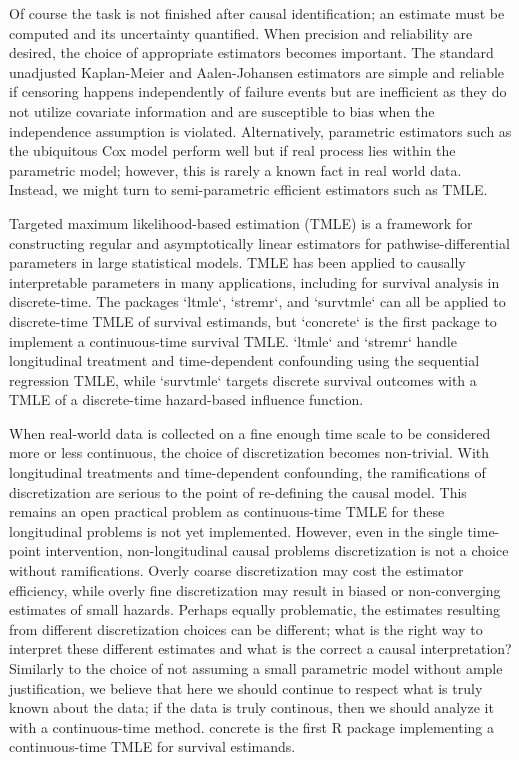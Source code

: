 \documentclass{report}
\newcommand{\1}{\ensuremath{\mathbf{1}}}
\begin{document}
Of course the task is not finished after causal identification; an estimate must be computed and its uncertainty quantified. When precision and reliability are desired, the choice of appropriate estimators becomes important. The standard unadjusted Kaplan-Meier and Aalen-Johansen estimators are simple and reliable if censoring happens independently of failure events but are inefficient as they do not utilize covariate information and are susceptible to bias when the independence assumption is violated. Alternatively, parametric estimators such as the ubiquitous Cox model perform well but if real process lies within the parametric model; however, this is rarely a known fact in real world data. Instead, we might turn to semi-parametric efficient estimators such as TMLE.

Targeted maximum likelihood-based estimation (TMLE) is a framework for constructing regular and asymptotically linear estimators for pathwise-differential parameters in large statistical models. TMLE has been applied to causally interpretable parameters in many applications, including for survival analysis in discrete-time. The packages `ltmle`, `stremr`, and `survtmle` can all be applied to discrete-time TMLE of survival estimands, but `concrete` is the first package to implement a continuous-time survival TMLE. `ltmle` and `stremr` handle longitudinal treatment and time-dependent confounding using the sequential regression TMLE, while `survtmle` targets discrete survival outcomes with a TMLE of a discrete-time hazard-based influence function.

When real-world data is collected on a fine enough time scale to be considered more or less continuous, the choice of discretization becomes non-trivial. With longitudinal treatments and time-dependent confounding, the ramifications of discretization are serious to the point of re-defining the causal model. This remains an open practical problem as continuous-time TMLE for these longitudinal problems is not yet implemented. However, even in the single time-point intervention, non-longitudinal causal problems discretization is not a choice without ramifications. Overly coarse discretization may cost the estimator efficiency, while overly fine discretization may result in biased or non-converging estimates of small hazards. Perhaps equally problematic, the estimates resulting from different discretization choices can be different; what is the right way to interpret these different estimates and what is the correct a causal interpretation? Similarly to the choice of not assuming a small parametric model without ample justification, we believe that here we should continue to respect what is truly known about the data; if the data is truly continous, then we should analyze it with a continuous-time method. concrete is the first R package implementing a continuous-time TMLE for survival estimands.
\end{document}
